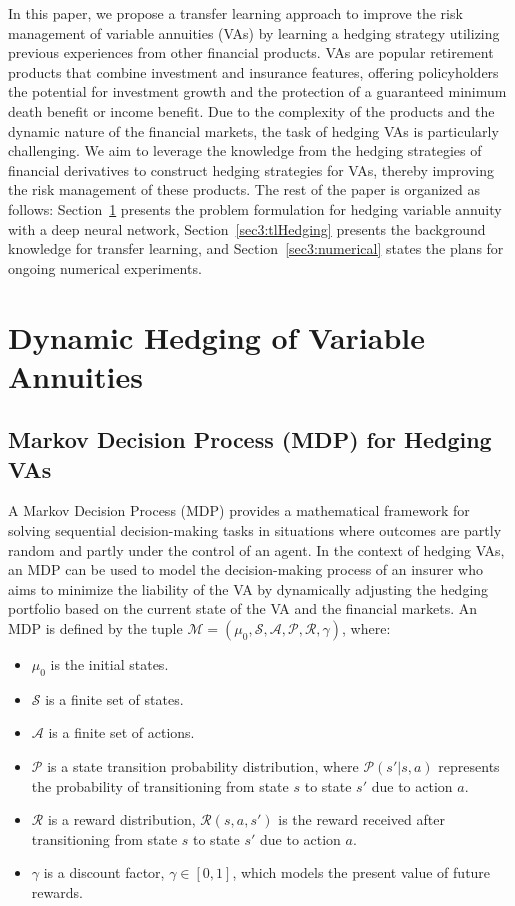 In this paper, we propose a transfer learning approach to improve the risk management of variable annuities (VAs) by learning a hedging strategy utilizing previous experiences from other financial products.
VAs are popular retirement products that combine investment and insurance features, offering policyholders the potential for investment growth and the protection of a guaranteed minimum death benefit or income benefit.
Due to the complexity of the products and the dynamic nature of the financial markets, the task of hedging VAs is particularly challenging.
We aim to leverage the knowledge from the hedging strategies of financial derivatives to construct hedging strategies for VAs, thereby improving the risk management of these products.
The rest of the paper is organized as follows: Section~\ref{sec3:vaHedging} presents the problem formulation for hedging variable annuity with a deep neural network, Section~\ref{sec3:tlHedging} presents the background knowledge for transfer learning, and Section~\ref{sec3:numerical} states the plans for ongoing numerical experiments.

\section{Dynamic Hedging of Variable Annuities} \label{sec3:vaHedging}

\subsection{Markov Decision Process (MDP) for Hedging VAs}
A Markov Decision Process (MDP) provides a mathematical framework for solving sequential decision-making tasks in situations where outcomes are partly random and partly under the control of an agent. 
In the context of hedging VAs, an MDP can be used to model the decision-making process of an insurer who aims to minimize the liability of the VA by dynamically adjusting the hedging portfolio based on the current state of the VA and the financial markets.
An MDP is defined by the tuple $\mathcal{M} = (\mu_0, \mathcal{S}, \mathcal{A}, \mathcal{P}, \mathcal{R}, \gamma)$, where:

\begin{itemize}
    \item $\mu_0$ is the initial states.
    \item $\mathcal{S}$ is a finite set of states.
    \item $\mathcal{A}$ is a finite set of actions.
    \item $\mathcal{P}$ is a state transition probability distribution, where $\mathcal{P}(s'|s, a)$ represents the probability of transitioning from state $s$ to state $s'$ due to action $a$.
    \item $\mathcal{R}$ is a reward distribution, $\mathcal{R}(s, a, s')$ is the reward received after transitioning from state $s$ to state $s'$ due to action $a$.
    \item $\gamma$ is a discount factor, $\gamma \in [0,1]$,  which models the present value of future rewards.
\end{itemize}

